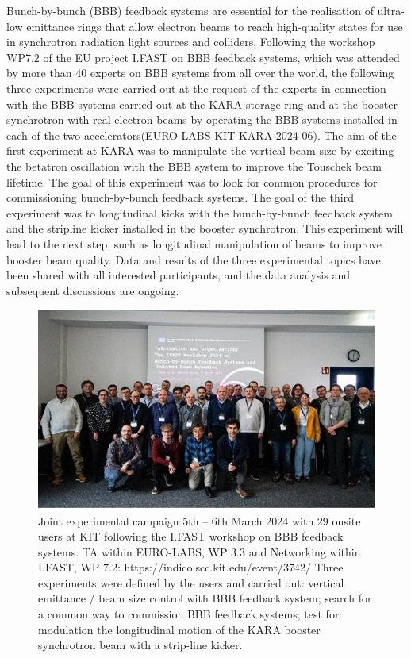 Bunch-by-bunch (BBB) feedback systems are essential for the realisation of ultra-low emittance rings that allow electron beams to reach high-quality states for use in synchrotron radiation light sources and colliders. Following the workshop WP7.2 of the EU project I.FAST on BBB feedback systems, which was attended by more than 40 experts on BBB systems from all over the world, the following three experiments were carried out at the request of the experts in connection with the BBB systems carried out at the KARA storage ring and at the booster synchrotron with real electron beams by operating the BBB systems installed in each of the two accelerators(EURO-LABS-KIT-KARA-2024-06). The aim of the first experiment at KARA was to manipulate the vertical beam size by exciting the betatron oscillation with the BBB system to improve the Touschek beam lifetime. The goal of this experiment was to look for common procedures for commissioning bunch-by-bunch feedback systems. The goal of the third experiment was to longitudinal kicks with the bunch-by-bunch feedback system and the stripline kicker installed in the booster synchrotron. This experiment will lead to the next step, such as longitudinal manipulation of beams to improve booster beam quality. Data and results of the three experimental topics have been shared with all interested participants, and the data analysis and subsequent discussions are ongoing. 
\begin{figure}[H]
    \centering
    \includegraphics[width=0.75\linewidth]{graphics/wp3-KIT_iFASTevent.jpg}
    \caption{Joint experimental campaign 5th – 6th March 2024 with 29 onsite users at KIT following the I.FAST workshop on BBB feedback systems. TA within EURO-LABS, WP 3.3  and  Networking within I.FAST, WP 7.2: https://indico.scc.kit.edu/event/3742/
Three experiments were defined by the users and carried out: vertical emittance / beam size control with BBB feedback system; search for a common way to commission BBB feedback systems; test for modulation the longitudinal motion of the KARA booster synchrotron beam with a strip-line kicker.}    
    \label{fig:kit_ifast}
\end{figure}


